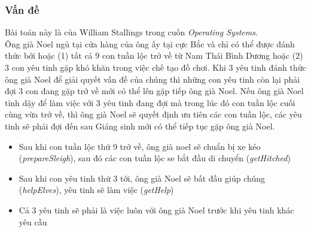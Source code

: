 \documentclass[12pt]{article}
\begin{document}
	\subsubsection{Vấn đề}
	Bài toán này là của William Stallings trong cuốn \textit{Operating Systems}.\\
	Ông già Noel ngủ tại cửa hàng của ông ấy tại cực Bắc và chỉ có thể được đánh thức bởi hoặc (1) tất cả 9 con tuần lộc trở về từ Nam Thái Bình Dương hoặc (2) 3 con yêu tinh gặp khó khăn trong việc chế tạo đồ chơi. Khi 3 yêu tinh đánh thức ông già Noel để giải quyết vấn đề của chúng thì những con yêu tinh còn lại phải đợi 3 con đang gặp trở về mới có thể lên gặp tiếp ông già Noel. Nếu ông già Noel tỉnh dậy để làm việc với 3 yêu tinh đang đợi mà trong lúc đó con tuần lộc cuối cùng vừa trở về, thì ông già Noel sẽ quyết định ưu tiên các con tuần lộc, các yêu tinh sẽ phải đợi đến sau Giáng sinh mới có thể tiếp tục gặp ông già Noel.
	\begin{itemize}
	\item Sau khi con tuần lộc thứ 9 trở về, ông già noel sẽ chuẩn bị xe kéo (\textit{prepareSleigh}), sau đó các con tuần lộc se bắt đầu di chuyển (\textit{getHitched})
	\item Sau khi con yêu tinh thứ 3 tới, ông già Noel sẽ bất đầu giúp chúng (\textit{helpElves}), yêu tinh sẽ làm việc (\textit{getHelp})
	\item Cả 3 yêu tinh sẽ phải là việc luôn với ông già Noel trước khi yêu tinh khác yêu cầu
	\end{itemize}
\newpage
\end{document}
